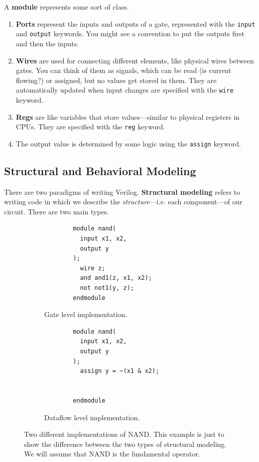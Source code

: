   \begin{definition}[Module]
    \label{def:module}
    A \textbf{module} represents some sort of class. 
    \begin{enumerate}
      \item \textbf{Ports} represent the inputs and outputs of a gate, represented with the \texttt{input} and \texttt{output} keywords. You might see a convention to put the outputs first and then the inputs. 
      \item \textbf{Wires} are used for connecting different elements, like physical wires between gates. You can think of them as signals, which can be read (is current flowing?) or assigned, but no values get stored in them. They are automatically updated when input changes are specified with the \texttt{wire} keyword. 
      \item \textbf{Regs} are like variables that store values---similar to physical registers in CPUs. They are specified with the \texttt{reg} keyword. 
      \item The output value is determined by some logic using the \texttt{assign} keyword. 
    \end{enumerate}
  \end{definition}

\subsection{Structural and Behavioral Modeling}

  There are two paradigms of writing Verilog. \textbf{Structural modeling} refers to writing code in which we describe the \textit{structure}---i.e. each component---of our circuit. There are two main types. 

  \begin{figure}[H]
    \centering
    \begin{subfigure}[b]{0.48\textwidth}
      \centering
      \begin{lstlisting}
        module nand(
          input x1, x2,
          output y
        );
          wire z; 
          and and1(z, x1, x2); 
          not not1(y, z);
        endmodule
      \end{lstlisting}
      \caption{Gate level implementation.}
    \end{subfigure}
    \hfill 
    \begin{subfigure}[b]{0.48\textwidth}
      \centering
      \begin{lstlisting}
        module nand(
          input x1, x2,
          output y
        );
          assign y = ~(x1 & x2);


        endmodule
      \end{lstlisting}
      \caption{Dataflow level implementation.}
    \end{subfigure}
    \caption{Two different implementations of NAND. This example is just to show the difference between the two types of structural modeling. We will assume that NAND is the fundamental operator. }
  \end{figure}

